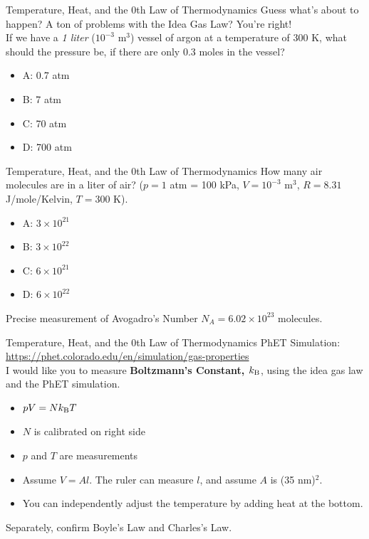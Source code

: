 \documentclass{beamer}
\begin{document}
\begin{frame}{Temperature, Heat, and the 0th Law of Thermodynamics}
Guess what's about to happen?  A ton of problems with the Idea Gas Law?  You're right! \\ \vspace{0.5cm}
If we have a \textit{1 liter} ($10^{-3}$ m$^3$) vessel of argon at a temperature of 300 K, what should the pressure be, if there are only 0.3 moles in the vessel?
\begin{itemize}
\item A: 0.7 atm
\item B: 7 atm
\item C: 70 atm
\item D: 700 atm
\end{itemize}
\end{frame}

\begin{frame}{Temperature, Heat, and the 0th Law of Thermodynamics}
How many air molecules are in a liter of air? ($p = 1$ atm = 100 kPa, $V = 10^{-3}$ m$^3$, $R = 8.31$ J/mole/Kelvin, $T = 300$ K).
\begin{itemize}
\item A: $3 \times 10^{21}$
\item B: $3 \times 10^{22}$
\item C: $6 \times 10^{21}$
\item D: $6 \times 10^{22}$
\end{itemize}
Precise measurement of Avogadro's Number $N_A = 6.02 \times 10^{23}$ molecules.
\end{frame}

\begin{frame}{Temperature, Heat, and the 0th Law of Thermodynamics}
PhET Simulation:
\url{https://phet.colorado.edu/en/simulation/gas-properties} \\ \vspace{0.5cm}
I would like you to measure \textbf{\alert{Boltzmann's Constant, $k_{\rm B}$}}, using the idea gas law and the PhET simulation.
\begin{itemize}
\item $pV = Nk_{\rm B}T$
\item $N$ is calibrated on right side
\item $p$ and $T$ are measurements
\item Assume $V = Al$.  The ruler can measure $l$, and assume $A$ is (35 nm)$^2$.
\item You can independently adjust the temperature by adding heat at the bottom.
\end{itemize}
Separately, confirm Boyle's Law and Charles's Law.
\end{frame}
\end{document}
